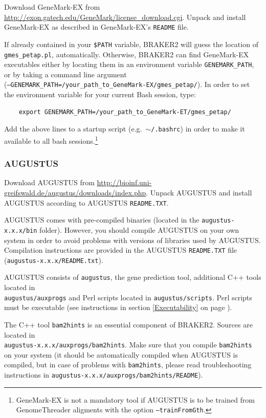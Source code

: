 \documentclass[a4paper,10pt]{report}
\begin{document}
Download GeneMark-EX from \url{http://exon.gatech.edu/GeneMark/license_download.cgi}.
 Unpack and install GeneMark-EX as described in GeneMark-EX's \texttt{README} file.

If already contained in your \texttt{\$PATH} variable, BRAKER2 will guess the location of \texttt{gmes\_petap.pl}, automatically. Otherwise, BRAKER2 can find GeneMark-EX executables either by locating them in an environment variable \texttt{GENEMARK\_PATH}, or by taking a command line argument\\ (\texttt{--GENEMARK\_PATH=/your\_path\_to\_GeneMark-EX/gmes\_petap/}). In order to set the environment variable for your current Bash session, type: 

    \begin{verbatim}
    export GENEMARK_PATH=/your_path_to_GeneMark-ET/gmes_petap/
\end{verbatim}

Add the above lines to a startup script (e.g.~\texttt{$\sim$/.bashrc}) in order to make it available to all bash sessions.\footnote{GeneMark-EX is not a mandatory tool if AUGUSTUS is to be trained from GenomeThreader aligments with the option \texttt{--trainFromGth}.}


\subsubsection{AUGUSTUS}

Download AUGUSTUS from \url{http://bioinf.uni-greifswald.de/augustus/downloads/index.php}.
 Unpack AUGUSTUS and install AUGUSTUS  according to AUGUSTUS \texttt{README.TXT}. 
 
 AUGUSTUS comes with pre-compiled binaries (located in the 
   \texttt{augustus-x.x.x/bin} folder). However, you should compile AUGUSTUS on your own system in order to avoid problems with versions of libraries used by AUGUSTUS. Compilation instructions are provided in the AUGUSTUS \texttt{README.TXT} file
   (\texttt{augustus-x.x.x/README.txt}).

AUGUSTUS consists of \texttt{augustus}, the gene prediction tool, additional C++ tools located in\\ \texttt{augustus/auxprogs} and Perl scripts located in \texttt{augustus/scripts}. Perl scripts must be executable (see instructions in section \ref{Executability} on page \pageref{Executability}). 
   
   The C++ tool \texttt{bam2hints} is an essential component of BRAKER2. Sources are located in \\\texttt{augustus-x.x.x/auxprogs/bam2hints}. Make sure that you compile \texttt{bam2hints} on your system (it should be automatically compiled when AUGUSTUS is compiled, but in case of problems with \texttt{bam2hints}, please read troubleshooting instructions in 
   \texttt{augustus-x.x.x/auxprogs/bam2hints/README}).
   
\end{document}
